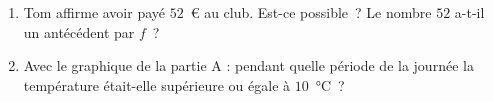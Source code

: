 \documentclass{article}
\begin{document}
\begin{enumerate}[resume]
  \item Tom affirme avoir payé $52$~€ au club. Est-ce possible~? Le nombre $52$ a-t-il un antécédent par $f$~?

  \medskip
  \dotfill

  \medskip
  \dotfill

  \medskip
  \dotfill

  \item Avec le graphique de la partie A : pendant quelle période de la journée la température était-elle supérieure ou égale à $10$~°C~?

  \medskip
  \dotfill
\end{enumerate}
\end{document}
